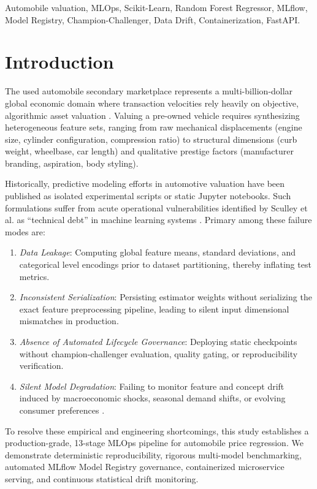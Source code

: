 \documentclass[conference]{IEEEtran}
\begin{document}
\begin{IEEEkeywords}
Automobile valuation, MLOps, Scikit-Learn, Random Forest Regressor, MLflow, Model Registry, Champion-Challenger, Data Drift, Containerization, FastAPI.
\end{IEEEkeywords}

\section{Introduction}
The used automobile secondary marketplace represents a multi-billion-dollar global economic domain where transaction velocities rely heavily on objective, algorithmic asset valuation \cite{gepner2018automobile}. Valuing a pre-owned vehicle requires synthesizing heterogeneous feature sets, ranging from raw mechanical displacements (engine size, cylinder configuration, compression ratio) to structural dimensions (curb weight, wheelbase, car length) and qualitative prestige factors (manufacturer branding, aspiration, body styling). 

Historically, predictive modeling efforts in automotive valuation have been published as isolated experimental scripts or static Jupyter notebooks. Such formulations suffer from acute operational vulnerabilities identified by Sculley et al. as ``technical debt'' in machine learning systems \cite{sculley2015hidden}. Primary among these failure modes are:
\begin{enumerate}
    \item \textit{Data Leakage}: Computing global feature means, standard deviations, and categorical level encodings prior to dataset partitioning, thereby inflating test metrics.
    \item \textit{Inconsistent Serialization}: Persisting estimator weights without serializing the exact feature preprocessing pipeline, leading to silent input dimensional mismatches in production.
    \item \textit{Absence of Automated Lifecycle Governance}: Deploying static checkpoints without champion-challenger evaluation, quality gating, or reproducibility verification.
    \item \textit{Silent Model Degradation}: Failing to monitor feature and concept drift induced by macroeconomic shocks, seasonal demand shifts, or evolving consumer preferences \cite{koren2020data}.
\end{enumerate}

To resolve these empirical and engineering shortcomings, this study establishes a production-grade, 13-stage MLOps pipeline for automobile price regression. We demonstrate deterministic reproducibility, rigorous multi-model benchmarking, automated MLflow Model Registry governance, containerized microservice serving, and continuous statistical drift monitoring.
\end{document}
